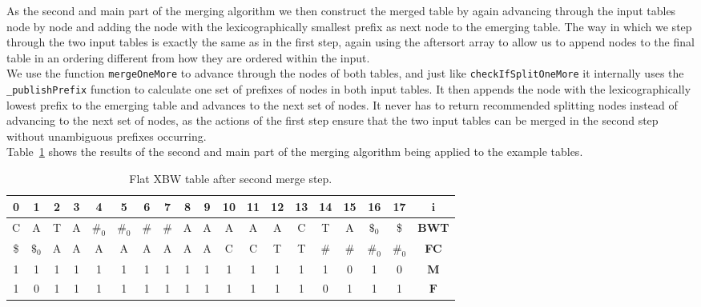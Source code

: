 \documentclass[a4paper,12pt,twoside,BCOR=10mm]{scrbook}
\begin{document}
As the second and main part of the merging algorithm
we then construct the merged table by again advancing through the
input tables node by node and adding the node with the lexicographically smallest prefix
as next node to the emerging table. The way in which we step through the two input tables
is exactly the same as in the first step, again using the aftersort array to allow us to
append nodes to the final table in an ordering different from how they are
ordered within the input. \\
We use the function \texttt{mergeOneMore} to advance through the nodes of both tables,
and just like \texttt{checkIfSplitOneMore} it internally uses the \texttt{\_publishPrefix} function
to calculate one set of prefixes of nodes in both input tables.
It then appends the node with the lexicographically lowest prefix to the emerging table
and advances to the next set of nodes.
It never has to return recommended splitting nodes instead of advancing to the next
set of nodes, as the actions of the first step ensure that the two input tables
can be merged in the second step without unambiguous prefixes occurring. \\
Table~\ref{table:evo_fig_flat_merge_step_two} shows the results of the
second and main part of the merging algorithm being applied
to the example tables.

\begin{table}[htb]
\centering
\caption[Flat XBW table after second merge step]{Flat XBW table after second merge step.}
{
\renewcommand{\tabcolsep}{5pt}
\begin{tabular}{ | c | c | c | c | c | c | c | c | c | c | c | c | c | c | c | c | c | c | c | }
\hline
0 & 1 & 2 & 3 & 4 & 5 & 6 & 7 & 8 & 9 & 10 & 11 & 12 & 13 & 14 & 15 & 16 & 17 & $\boldsymbol{i}$ \\ \hline
C & A & T & A & $\#_0$ & $\#_0$ & $\#$ & $\#$ & A & A & A & A & A & C & T & A & $\$_0$ & \$ & \textbf{BWT} \\ \hline
\$ & $\$_0$ & A & A & A & A & A & A & A & A & C & C & T & T & $\#$ & $\#$ & $\#_0$ & $\#_0$ & \textbf{FC} \\ \hline
1 & 1 & 1 & 1 & 1 & 1 & 1 & 1 & 1 & 1 & 1 & 1 & 1 & 1 & 1 & 0 & 1 & 0 & $\boldsymbol{M}$ \\ \hline
1 & 0 & 1 & 1 & 1 & 1 & 1 & 1 & 1 & 1 & 1 & 1 & 1 & 1 & 0 & 1 & 1 & 1 & $\boldsymbol{F}$ \\ \hline
\end{tabular}
}
\label{table:evo_fig_flat_merge_step_two}
\end{table}
\end{document}
